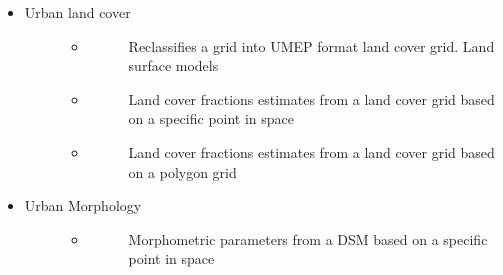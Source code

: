 \documentclass[letterpaper,10pt,english]{sphinxmanual}
\begin{document}
\begin{itemize}
\begin{description}
\begin{itemize}
\begin{description}
\begin{itemize}
\begin{description}
\end{description}

\end{itemize}

\end{description}

\item {} \begin{description}
\item[{Urban land cover}] \leavevmode\begin{itemize}
\item {} \begin{description}
\item[{}] \leavevmode
Reclassifies a grid into UMEP format land cover grid. Land surface models

\end{description}

\item {} \begin{description}
\item[{}] \leavevmode
Land cover fractions estimates from a land cover grid based on a specific point in space

\end{description}

\item {} \begin{description}
\item[{}] \leavevmode
Land cover fractions estimates from a land cover grid based on a polygon grid

\end{description}

\end{itemize}

\end{description}

\item {} \begin{description}
\item[{Urban Morphology}] \leavevmode\begin{itemize}
\item {} \begin{description}
\item[{}] \leavevmode
Morphometric parameters from a DSM based on a specific point in space


\end{description}
\end{itemize}
\end{description}
\end{itemize}
\end{description}
\end{itemize}
\end{document}
